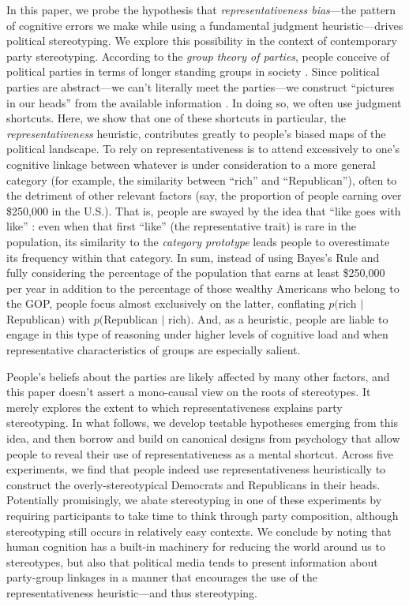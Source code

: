 \documentclass[12pt, letterpaper]{article}
\begin{document}
In this paper, we probe the hypothesis that \emph{representativeness bias}---the pattern of cognitive errors we make while using a fundamental judgment heuristic---drives political stereotyping. We explore this possibility in the context of contemporary party stereotyping. According to the \emph{group theory of parties}, people conceive of political parties in terms of longer standing groups in society \citep{ahler2018forum, busby2016what,GreenPalmquistSchickler2002,mason2018uncivil}. Since political parties are abstract---we can't literally meet the parties---we construct ``pictures in our heads'' from the available information \citep{Lippmann1922}. In doing so, we often use judgment shortcuts. Here, we show that one of these shortcuts in particular, the \emph{representativeness} heuristic, contributes greatly to people's biased maps of the political landscape. To rely on representativeness is to attend excessively to one's cognitive linkage between whatever is under consideration to a more general category (for example, the similarity between ``rich'' and ``Republican''), often to the detriment of other relevant factors (say, the proportion of people earning over \$250,000 in the U.S.). That is, people are swayed by the idea that ``like goes with like'' \citep{gilovich1981like}: even when that first ``like'' (the representative trait) is rare in the population, its similarity to the \emph{category prototype} leads people to overestimate its frequency within that category. In sum, instead of using Bayes's Rule and fully considering the percentage of the population that earns at least \$250,000 per year in addition to the percentage of those wealthy Americans who belong to the GOP, people focus almost exclusively on the latter, conflating $p($rich $|$ Republican$)$ with $p($Republican $|$ rich$)$. And, as a heuristic, people are liable to engage in this type of reasoning under higher levels of cognitive load and when representative characteristics of groups are especially salient.

People's beliefs about the parties are likely affected by many other factors, and this paper doesn't assert a mono-causal view on the roots of stereotypes. It merely explores the extent to which representativeness explains party stereotyping. In what follows, we develop testable hypotheses emerging from this idea, and then borrow and build on canonical designs from psychology that allow people to reveal their use of representativeness as a mental shortcut. Across five experiments, we find that people indeed use representativeness heuristically to construct the overly-stereotypical Democrats and Republicans in their heads. Potentially promisingly, we abate stereotyping in one of these experiments by requiring participants to take time to think through party composition, although stereotyping still occurs in relatively easy contexts. We conclude by noting that human cognition has a built-in machinery for reducing the world around us to stereotypes, but also that political media tends to present information about party-group linkages in a manner that encourages the use of the representativeness heuristic---and thus stereotyping.
\end{document}
